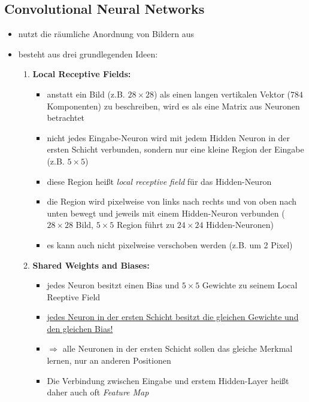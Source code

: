 \subsection{Convolutional Neural Networks}

\begin{itemize}
  \item nutzt die räumliche Anordnung von Bildern aus
  \item besteht aus drei grundlegenden Ideen:
  \begin{enumerate}
    \item \textbf{Local Receptive Fields:}
    \begin{itemize}
      \item anstatt ein Bild (z.B. $28 \times 28$) als einen langen vertikalen Vektor ($784$ Komponenten) zu beschreiben, wird es als eine Matrix aus Neuronen betrachtet
      \item nicht jedes Eingabe-Neuron wird mit jedem Hidden Neuron in der ersten Schicht verbunden, sondern nur eine kleine Region der Eingabe (z.B. $5 \times 5$)
      \item diese Region heißt \emph{local receptive field} für das Hidden-Neuron
      \item die Region wird pixelweise von links nach rechts und von oben nach unten bewegt und jeweils mit einem Hidden-Neuron verbunden ($28 \times 28$ Bild, $5 \times 5$ Region führt zu $24 \times 24$ Hidden-Neuronen)
      \item es kann auch nicht pixelweise verschoben werden (z.B. um 2 Pixel)
    \end{itemize}
    \item \textbf{Shared Weights and Biases:}
    \begin{itemize}
      \item jedes Neuron besitzt einen Bias und $5 \times 5$ Gewichte zu seinem Local Reeptive Field
      \item \underline{jedes Neuron in der ersten Schicht besitzt die gleichen Gewichte und den gleichen Bias!}
      \item $\Rightarrow$ alle Neuronen in der ersten Schicht sollen das gleiche Merkmal lernen, nur an anderen Positionen
      \item Die Verbindung zwischen Eingabe und erstem Hidden-Layer heißt daher auch oft \emph{Feature Map}
    \end{itemize}
  \end{enumerate}
\end{itemize}
